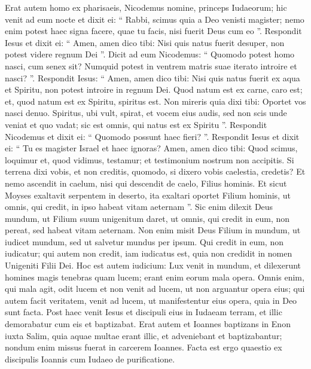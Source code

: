 \begin{biblechapter}
\begin{biblechapter}
\begin{biblechapter}
\verse Erat autem homo ex pharisaeis, Nicodemus nomine, princeps Iudaeorum; 
\verse hic venit ad eum nocte et dixit ei: “ Rabbi, scimus quia a Deo venisti magister; nemo enim potest haec signa facere, quae tu facis, nisi fuerit Deus cum eo ”. 
\verse Respondit Iesus et dixit ei: “ Amen, amen dico tibi: Nisi quis natus fuerit desuper, non potest videre regnum Dei ”. 
\verse Dicit ad eum Nicodemus: “ Quomodo potest homo nasci, cum senex sit? Numquid potest in ventrem matris suae iterato introire et nasci? ”. 
\verse Respondit Iesus: “ Amen, amen dico tibi: Nisi quis natus fuerit ex aqua et Spiritu, non potest introire in regnum Dei. 
\verse Quod natum est ex carne, caro est; et, quod natum est ex Spiritu, spiritus est. 
\verse Non mireris quia dixi tibi: Oportet vos nasci denuo. 
\verse Spiritus, ubi vult, spirat, et vocem eius audis, sed non scis unde veniat et quo vadat; sic est omnis, qui natus est ex Spiritu ”. 
\verse Respondit Nicodemus et dixit ei: “ Quomodo possunt haec fieri? ”. 
\verse Respondit Iesus et dixit ei: “ Tu es magister Israel et haec ignoras? 
\verse Amen, amen dico tibi: Quod scimus, loquimur et, quod vidimus, testamur; et testimonium nostrum non accipitis. 
\verse Si terrena dixi vobis, et non creditis, quomodo, si dixero vobis caelestia, credetis? 
\verse Et nemo ascendit in caelum, nisi qui descendit de caelo, Filius hominis. 
\verse Et sicut Moyses exaltavit serpentem in deserto, ita exaltari oportet Filium hominis, 
\verse ut omnis, qui credit, in ipso habeat vitam aeternam ”.
 \verse Sic enim dilexit Deus mundum, ut Filium suum unigenitum daret, ut omnis, qui credit in eum, non pereat, sed habeat vitam aeternam. 
\verse Non enim misit Deus Filium in mundum, ut iudicet mundum, sed ut salvetur mundus per ipsum. 
\verse Qui credit in eum, non iudicatur; qui autem non credit, iam iudicatus est, quia non credidit in nomen Unigeniti Filii Dei. 
\verse Hoc est autem iudicium: Lux venit in mundum, et dilexerunt homines magis tenebras quam lucem; erant enim eorum mala opera. 
\verse Omnis enim, qui mala agit, odit lucem et non venit ad lucem, ut non arguantur opera eius; 
\verse qui autem facit veritatem, venit ad lucem, ut manifestentur eius opera, quia in Deo sunt facta.
 \verse Post haec venit Iesus et discipuli eius in Iudaeam terram, et illic demorabatur cum eis et baptizabat. 
\verse Erat autem et Ioannes baptizans in Enon iuxta Salim, quia aquae multae erant illic, et adveniebant et baptizabantur; 
\verse nondum enim missus fuerat in carcerem Ioannes.
 \verse Facta est ergo quaestio ex discipulis Ioannis cum Iudaeo de purificatione. 

\end{biblechapter}
\end{biblechapter}
\end{biblechapter}
